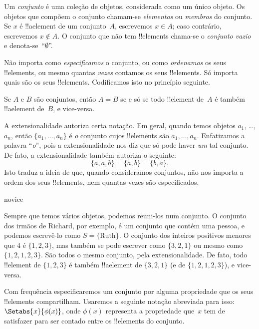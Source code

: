 \documentclass[../../../include/open-logic-section]{subfiles}
\begin{document}

Um \emph{conjunto} é uma coleção de objetos, considerada como um único
objeto. Os objetos que compõem o conjunto chamam-se \emph{elementos} ou
\emph{membros} do conjunto. Se $x$ é !!a{element} de um conjunto~$A$,
escrevemos $x \in A$; caso contrário, escrevemos $x \notin A$. O conjunto que
não tem !!{element}s chama-se o \emph{conjunto vazio} e
denota-se~``$\emptyset$''.

\begin{explain}
Não importa como \emph{especificamos} o conjunto, ou como
\emph{ordenamos} os seus !!{element}s, ou mesmo quantas \emph{vezes}
contamos os seus !!{element}s. Só importa quais são os seus !!{element}s.
Codificamos isto no princípio seguinte.
\end{explain}

\begin{defn}[Extensionalidade]
  Se $A$ e $B$ são conjuntos, então $A = B$ se e só se
  todo !!{element} de~$A$ é também !!a{element} de~$B$, e vice-versa.
\end{defn}

A extensionalidade autoriza certa notação. Em geral, quando temos
objetos $a_{1}$, \dots, $a_{n}$, então $\{a_{1}, \dots, a_{n}\}$ é
\emph{o} conjunto cujos !!{element}s são $a_1, \ldots, a_n$. Enfatizamos
a palavra ``\emph{o}'', pois a extensionalidade nos diz que só pode haver
\emph{um} tal conjunto. De fato, a extensionalidade também autoriza o
seguinte:
  \[
    \{a, a, b\} = \{a, b\} = \{b,a\}.
  \] 
Isto traduz a ideia de que, quando consideramos conjuntos, não nos importa a
ordem dos seus !!{element}s, nem quantas vezes são especificados.

\begin{tagblock}{novice}
\begin{ex}
Sempre que temos vários objetos, podemos reuni-los num
conjunto. O conjunto dos irmãos de Richard, por exemplo, é um conjunto que
contém uma pessoa, e podemos escrevê-lo como $S=\{\textrm{Ruth}\}$.
O conjunto dos inteiros positivos menores que $4$ é $\{1, 2, 3\}$, mas também
se pode escrever como $\{3, 2, 1\}$ ou mesmo como $\{1, 2, 1, 2, 3\}$.
São todos o mesmo conjunto, pela extensionalidade. De fato, todo !!{element}
de $\{1, 2, 3\}$ é também !!a{element} de $\{3, 2, 1\}$ (e de $\{1,
2, 1, 2, 3\}$), e vice-versa.
\end{ex} 
\end{tagblock}

Com frequência especificaremos um conjunto por alguma propriedade que os seus
!!{element}s compartilham. Usaremos a seguinte notação abreviada para isso:
$\Setabs{x}{\phi(x)}$, onde $\phi(x)$ representa a propriedade
que~$x$ tem de satisfazer para ser contado entre os !!{element}s do
conjunto. 
\end{document}
